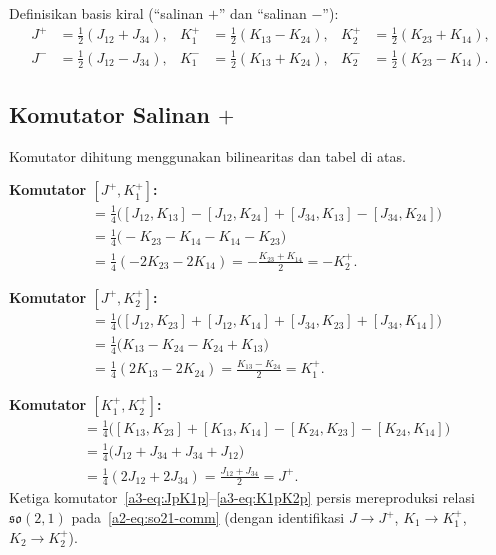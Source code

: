 Definisikan basis kiral (``salinan $+$'' dan ``salinan $-$''):
\begin{align}
    J^+ &= \tfrac{1}{2}(J_{12} + J_{34}), & K_1^+ &= \tfrac{1}{2}(K_{13} - K_{24}), & K_2^+ &= \tfrac{1}{2}(K_{23} + K_{14}), \label{a3-eq:plus}\\[4pt]
    J^- &= \tfrac{1}{2}(J_{12} - J_{34}), & K_1^- &= \tfrac{1}{2}(K_{13} + K_{24}), & K_2^- &= \tfrac{1}{2}(K_{23} - K_{14}). \label{a3-eq:minus}
\end{align}

\subsection{Komutator Salinan $+$}

Komutator dihitung menggunakan bilinearitas dan tabel di atas.

\vspace{0.5em}
\noindent \textbf{Komutator $[J^+, K_1^+]$:}
\begin{align}
    [J^+, K_1^+] &= \tfrac{1}{4}\big([J_{12}, K_{13}] - [J_{12}, K_{24}] + [J_{34}, K_{13}] - [J_{34}, K_{24}]\big) \nonumber\\[4pt]
    &= \tfrac{1}{4}\big(-K_{23} - K_{14} - K_{14} - K_{23}\big) \nonumber\\[4pt]
    &= \tfrac{1}{4}(-2K_{23} - 2K_{14}) = -\frac{K_{23} + K_{14}}{2} = -K_2^+. \label{a3-eq:JpK1p}
\end{align}

\vspace{0.5em}
\noindent \textbf{Komutator $[J^+, K_2^+]$:}
\begin{align}
    [J^+, K_2^+] &= \tfrac{1}{4}\big([J_{12}, K_{23}] + [J_{12}, K_{14}] + [J_{34}, K_{23}] + [J_{34}, K_{14}]\big) \nonumber\\[4pt]
    &= \tfrac{1}{4}\big(K_{13} - K_{24} - K_{24} + K_{13}\big) \nonumber\\[4pt]
    &= \tfrac{1}{4}(2K_{13} - 2K_{24}) = \frac{K_{13} - K_{24}}{2} = K_1^+. \label{a3-eq:JpK2p}
\end{align}

\vspace{0.5em}
\noindent \textbf{Komutator $[K_1^+, K_2^+]$:}
\begin{align}
    [K_1^+, K_2^+] &= \tfrac{1}{4}\big([K_{13}, K_{23}] + [K_{13}, K_{14}] - [K_{24}, K_{23}] - [K_{24}, K_{14}]\big) \nonumber\\[4pt]
    &= \tfrac{1}{4}\big(J_{12} + J_{34} + J_{34} + J_{12}\big) \nonumber\\[4pt]
    &= \tfrac{1}{4}(2J_{12} + 2J_{34}) = \frac{J_{12} + J_{34}}{2} = J^+. \label{a3-eq:K1pK2p}
\end{align}
Ketiga komutator~\eqref{a3-eq:JpK1p}--\eqref{a3-eq:K1pK2p} persis mereproduksi relasi $\mathfrak{so}(2,1)$ pada~\eqref{a2-eq:so21-comm} (dengan identifikasi $J \to J^+$, $K_1 \to K_1^+$, $K_2 \to K_2^+$).

